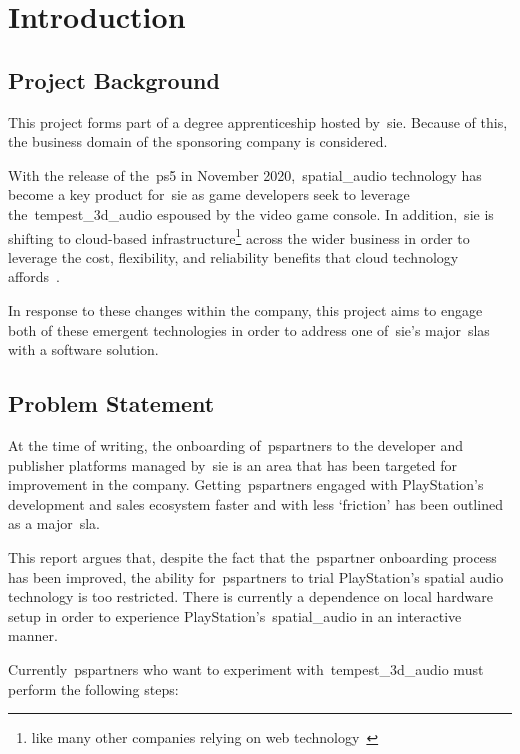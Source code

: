 \thispagestyle{plain}
\newpage
\section{Introduction}\label{sec:introduction}
\subsection{Project Background}\label{subsec:project-background}
\normalsize

This project forms part of a degree apprenticeship hosted by~\gls{sie}.
Because of this, the business domain of the sponsoring company is considered.

With the release of the~\gls{ps5} in November 2020,~\gls{spatial_audio} technology has become a key product for~\gls{sie} as game developers seek to leverage the~\gls{tempest_3d_audio} espoused by the video game console.
In addition,~\gls{sie} is shifting to cloud-based infrastructure\footnote{like many other companies relying on web technology~\citep{cc_overview}} across the wider business in order to leverage the cost, flexibility, and reliability benefits that cloud technology affords~\citep{cc_overview}.

In response to these changes within the company, this project aims to engage both of these emergent technologies in order to address one of~\gls{sie}'s major~\glspl{sla} with a software solution.

\subsection{Problem Statement}\label{subsec:problem-statement}

At the time of writing,
the onboarding of~\glspl{pspartner} to the developer and publisher platforms
managed by~\gls{sie} is an area that has been targeted for improvement in the company.
Getting~\glspl{pspartner} engaged with PlayStation's development and sales ecosystem faster and with less `friction' has been outlined as a major~\gls{sla}.

This report argues that, despite the fact that the~\gls{pspartner} onboarding process has been improved, the ability for~\glspl{pspartner} to trial PlayStation's spatial audio technology is too restricted.
There is currently a dependence on local hardware setup in order to experience PlayStation's~\gls{spatial_audio} in an interactive manner.

Currently~\glspl{pspartner} who want to experiment with~\gls{tempest_3d_audio} must perform the following steps:

